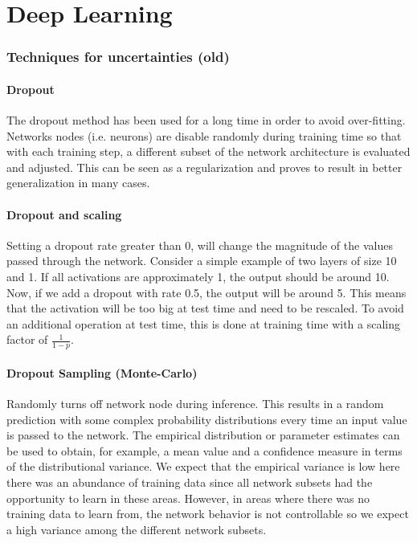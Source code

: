 \part{Deep Learning}

\section{Techniques for uncertainties (old)}

\subsection{Dropout}
The dropout method has been used for a long time in order to avoid over-fitting. Networks nodes (i.e. neurons) are disable randomly during training time so that with each training step, a different subset of the network architecture is evaluated and adjusted. This can be seen as a regularization and proves to result in better generalization in many cases.

\subsection{Dropout and scaling}
Setting a dropout rate greater than 0, will change the magnitude of the values passed through the network. Consider a simple example of two layers of size 10 and 1. If all activations are approximately 1, the output should be around 10. Now, if we add a dropout with rate 0.5, the output will be around 5. This means that the activation will be too big at test time and need to be rescaled. To avoid an additional operation at test time, this is done at training time with a scaling factor of $\frac{1}{1-p}$.


\subsection{Dropout Sampling (Monte-Carlo)}
Randomly turns off network node during inference. This results in a random prediction with some complex probability distributions every time an input value is passed to the network. The empirical distribution or parameter estimates can be used to obtain, for example, a mean value and a confidence measure in terms of the distributional variance. We expect that the empirical variance is low here there was an abundance of training data since all network subsets had the opportunity to learn in these areas. However, in areas where there was no training data to learn from, the network behavior is not controllable so we expect a high variance among the different network subsets.


